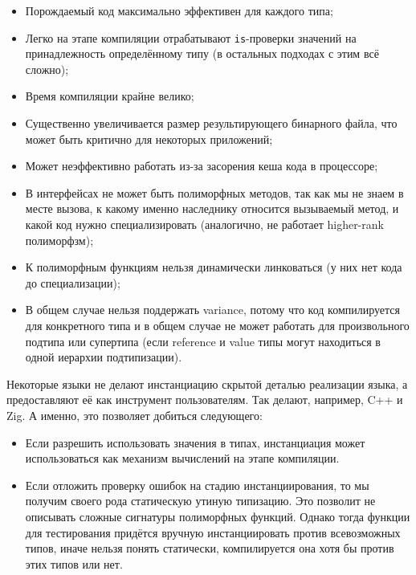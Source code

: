 \begin{itemize}
    \item[\positive] Порождаемый код максимально эффективен для каждого типа;
    \item[\positive] Легко на этапе компиляции отрабатывают \texttt{is}-проверки значений на принадлежность определённому типу (в остальных подходах с этим всё сложно);
    \item[\negative] Время компиляции крайне велико;
    \item[\negative] Существенно увеличивается размер результирующего бинарного файла, что может быть критично для некоторых приложений;
    \item[\negative] Может неэффективно работать из-за засорения кеша кода в процессоре;
    \item[\negative] В интерфейсах не может быть полиморфных методов, так как мы не знаем в месте вызова, к какому именно наследнику относится вызываемый метод, и какой код нужно специализировать (аналогично, не работает higher-rank полиморфзм);
    \item[\negative] К полиморфным функциям нельзя динамически линковаться (у них нет кода до специализации);
    \item[\negative] В общем случае нельзя поддержать variance, потому что код компилируется для конкретного типа и в общем случае не может работать для произвольного подтипа или супертипа (если reference и value типы могут находиться в одной иерархии подтипизации).
\end{itemize}

Некоторые языки не делают инстанциацию скрытой деталью реализации языка, а предоставляют её как инструмент пользователям.
Так делают, например, C++ и Zig.
А именно, это позволяет добиться следующего:
\begin{itemize}
    \item Если разрешить использовать значения в типах, инстанциация может использоваться как механизм вычислений на этапе компиляции.
    \item Если отложить проверку ошибок на стадию инстанциирования, то мы получим своего рода статическую утиную типизацию.
    Это позволит не описывать сложные сигнатуры полиморфных функций.
    Однако тогда функции для тестирования придётся вручную инстанциировать против всевозможных типов, иначе нельзя понять статически, компилируется она хотя бы против этих типов или нет.
\end{itemize}


